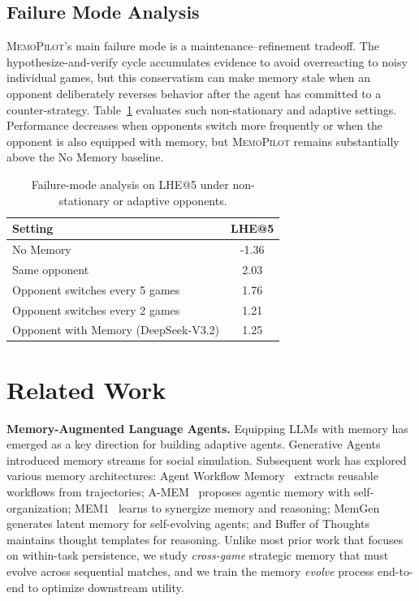 \documentclass{article}
\newcommand{\methodname}{MemoPilot}
\newcommand{\method}{\textsc{\methodname}}
\theoremstyle{plain}
\theoremstyle{definition}
\theoremstyle{remark}
\begin{document}
\subsection{Failure Mode Analysis}

\method{}'s main failure mode is a maintenance--refinement tradeoff. The hypothesize-and-verify cycle accumulates evidence to avoid overreacting to noisy individual games, but this conservatism can make memory stale when an opponent deliberately reverses behavior after the agent has committed to a counter-strategy. Table~\ref{tab:failure_modes} evaluates such non-stationary and adaptive settings. Performance decreases when opponents switch more frequently or when the opponent is also equipped with memory, but \method{} remains substantially above the No Memory baseline.

\begin{table}[t]
\centering
\caption{Failure-mode analysis on LHE@5 under non-stationary or adaptive opponents.}
\label{tab:failure_modes}
\small
\begin{tabular}{@{}lc@{}}
\toprule
\textbf{Setting} & \textbf{LHE@5} \\
\midrule
No Memory & -1.36 \\
Same opponent & 2.03 \\
Opponent switches every 5 games & 1.76 \\
Opponent switches every 2 games & 1.21 \\
Opponent with Memory (DeepSeek-V3.2) & 1.25 \\
\bottomrule
\end{tabular}
\end{table}

\section{Related Work}
\label{sec:related}

\textbf{Memory-Augmented Language Agents.}
Equipping LLMs with memory has emerged as a key direction for building adaptive agents. Generative Agents~\citep{park2023generative} introduced memory streams for social simulation. Subsequent work has explored various memory architectures: Agent Workflow Memory~\citep{wang2025agent} extracts reusable workflows from trajectories; A-MEM~\citep{xu2025amemagenticmemoryllm} proposes agentic memory with self-organization; MEM1~\citep{zhou2025mem1learningsynergizememory} learns to synergize memory and reasoning; MemGen~\citep{memgen2025} generates latent memory for self-evolving agents; and Buffer of Thoughts~\citep{yang2024buffer} maintains thought templates for reasoning. Unlike most prior work that focuses on within-task persistence, we study \emph{cross-game} strategic memory that must evolve across sequential matches, and we train the memory \emph{evolve} process end-to-end to optimize downstream utility.
 
\end{document}
